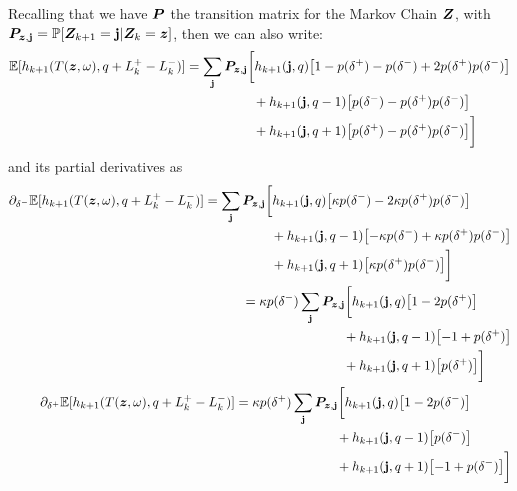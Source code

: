 Recalling that we have  $\bm{P}$ the transition matrix for the Markov Chain $\bm{Z}$, with $\bm{P}_{\bm{z}, \mathbf{j}} = \mathbb{P}[\bm{Z}_{k+1} = \mathbf{j} | \bm{Z}_k = \bm{z}]$, then we can also write:
\begin{equation}
\begin{split}
\E[h_{k+1}(T(\bz,\omega), q + L_k^+ - L_k^- )] & = \sum_\bj \bP_{\bz,\bj} \biggl[ h_{k+1}(\bj, q) \bigl[ 1 - p(\delta^+) - p(\delta^-) + 2 p(\delta^+) p(\delta^-) \bigr]  \\
& \hphantom{\sum_\bj \bP_{\bz,\bj} \biggl[ {}+{}} + h_{k+1}(\bj, q-1) \bigl[ p(\delta^-)  - p(\delta^+) p(\delta^-) \bigr]   \\
& \hphantom{\sum_\bj \bP_{\bz,\bj} \biggl[ {}+{}} + h_{k+1}(\bj, q+1) \bigl[ p(\delta^+)  - p(\delta^+) p(\delta^-) \bigr] \biggr]
\end{split}
\end{equation}
and its partial derivatives as
\begin{align}
\begin{split}
\partial_{\delta^-} \E[h_{k+1}(T(\bz,\omega), q + L_k^+ - L_k^- )] & = 
\sum_\bj \bP_{\bz,\bj} \biggl[ h_{k+1}(\bj, q) \bigl[ \kappa p(\delta^-) - 2 \kappa p(\delta^+) p(\delta^-) \bigr]  \\
& \hphantom{\sum_\bj \bP_{\bz,\bj} \biggl[ {}+{}} + h_{k+1}(\bj, q-1) \bigl[ -\kappa p(\delta^-) + \kappa p(\delta^+) p(\delta^-) \bigr]   \\
& \hphantom{\sum_\bj \bP_{\bz,\bj} \biggl[ {}+{}} + h_{k+1}(\bj, q+1) \bigl[ \kappa p(\delta^+) p(\delta^-) \bigr] \biggr]
\end{split} \\
\begin{split}
& = \kappa p(\delta^-) \sum_\bj \bP_{\bz,\bj} \biggl[ h_{k+1}(\bj, q) \bigl[ 1 - 2 p(\delta^+) \bigr]  \\
& \hphantom{d(\delta^-) \sum_\bj \bP_{\bz,\bj} \biggl[ {}+{}} + h_{k+1}(\bj, q-1) \bigl[-1 + p(\delta^+) \bigr]   \\
& \hphantom{d(\delta^-) \sum_\bj \bP_{\bz,\bj} \biggl[ {}+{}} + h_{k+1}(\bj, q+1) \bigl[ p(\delta^+) \bigr] \biggr]
\end{split} \\
\begin{split}
\partial_{\delta^+} \E[h_{k+1}(T(\bz,\omega), q + L_k^+ - L_k^- )] & = 
\kappa p(\delta^+) \sum_\bj \bP_{\bz,\bj} \biggl[ h_{k+1}(\bj, q) \bigl[ 1 - 2 p(\delta^-) \bigr]  \\
& \hphantom{d(\delta^-) \sum_\bj \bP_{\bz,\bj} \biggl[ {}+{}} + h_{k+1}(\bj, q-1) \bigl[ p(\delta^-) \bigr]   \\
& \hphantom{d(\delta^-) \sum_\bj \bP_{\bz,\bj} \biggl[ {}+{}} + h_{k+1}(\bj, q+1) \bigl[ -1 + p(\delta^-) \bigr] \biggr]
\end{split}
\end{align}

